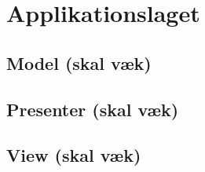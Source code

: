 \chapter{Applikationslaget}

\section{Model (skal væk)}



\section{Presenter (skal væk)}

\section{View (skal væk)}








